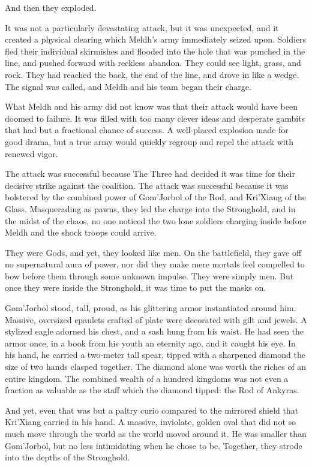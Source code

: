 And then they exploded.

It was not a particularly devastating attack, but it was unexpected, and it created a physical clearing which Meldh’s army immediately seized upon. Soldiers fled their individual skirmishes and flooded into the hole that was punched in the line, and pushed forward with reckless abandon. They could see light, grass, and rock. They had reached the back, the end of the line, and drove in like a wedge. The signal was called, and Meldh and his team began their charge.

What Meldh and his army did not know was that their attack would have been doomed to failure. It was filled with too many clever ideas and desperate gambits that had but a fractional chance of success. A well-placed explosion made for good drama, but a true army would quickly regroup and repel the attack with renewed vigor.

The attack was successful because The Three had decided it was time for their decisive strike against the coalition. The attack was successful because it was bolstered by the combined power of Gom’Jorbol of the Rod, and Kri’Xiang of the Glass. Masquerading as pawns, they led the charge into the Stronghold, and in the midst of the chaos, no one noticed the two lone soldiers charging inside before Meldh and the shock troops could arrive.

They were Gods, and yet, they looked like men. On the battlefield, they gave off no supernatural aura of power, nor did they make mere mortals feel compelled to bow before them through some unknown impulse. They were simply men. But once they were inside the Stronghold, it was time to put the masks on.

Gom’Jorbol stood, tall, proud, as his glittering armor instantiated around him. Massive, oversized epaulets crafted of plate were decorated with gilt and jewels. A stylized eagle adorned his chest, and a sash hung from his waist. He had seen the armor once, in a book from his youth an eternity ago, and it caught his eye. In his hand, he carried a two-meter tall spear, tipped with a sharpened diamond the size of two hands clasped together. The diamond alone was worth the riches of an entire kingdom. The combined wealth of a hundred kingdoms was not even a fraction as valuable as the staff which the diamond tipped: the Rod of Ankyras.

And yet, even that was but a paltry curio compared to the mirrored shield that Kri’Xiang carried in his hand. A massive, inviolate, golden oval that did not so much move through the world as the world moved around it. He was smaller than Gom’Jorbol, but no less intimidating when he chose to be. Together, they strode into the depths of the Stronghold.

